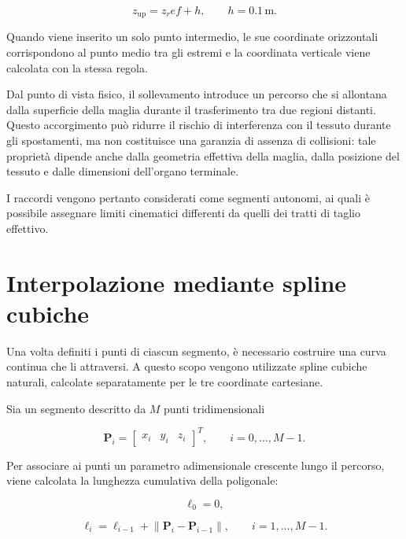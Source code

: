 \begin{equation}
    z_{\mathrm{up}} = z_ref + h,
    \qquad h=0.1\,\mathrm{m}.
    \label{eq:quota_raccordo}
\end{equation}

Quando viene inserito un solo punto intermedio, le sue coordinate orizzontali corrispondono al punto medio tra gli estremi e la coordinata verticale viene calcolata con la stessa regola.

Dal punto di vista fisico, il sollevamento introduce un percorso che si allontana dalla superficie della maglia durante il trasferimento tra due regioni distanti. Questo accorgimento può ridurre il rischio di interferenza con il tessuto durante gli spostamenti, ma non costituisce una garanzia di assenza di collisioni: tale proprietà dipende anche dalla geometria effettiva della maglia, dalla posizione del tessuto e dalle dimensioni dell'organo terminale.

I raccordi vengono pertanto considerati come segmenti autonomi, ai quali è possibile assegnare limiti cinematici differenti da quelli dei tratti di taglio effettivo.

\section{Interpolazione mediante spline cubiche}

Una volta definiti i punti di ciascun segmento, è necessario costruire una curva continua che li attraversi. A questo scopo vengono utilizzate spline cubiche naturali, calcolate separatamente per le tre coordinate cartesiane.

Sia un segmento descritto da $M$ punti tridimensionali

\begin{equation}
    \mathbf{P}_i =
    \begin{bmatrix}
        x_i & y_i & z_i
    \end{bmatrix}^{T},
    \qquad i=0,\ldots,M-1.
\end{equation}

Per associare ai punti un parametro adimensionale crescente lungo il percorso, viene calcolata la lunghezza cumulativa della poligonale:

\begin{equation}
    \ell_0 = 0,
\end{equation}

\begin{equation}
    \ell_i = \ell_{i-1}
    + \left\|\mathbf{P}_i-\mathbf{P}_{i-1}\right\|,
    \qquad i=1,\ldots,M-1.
\end{equation}

